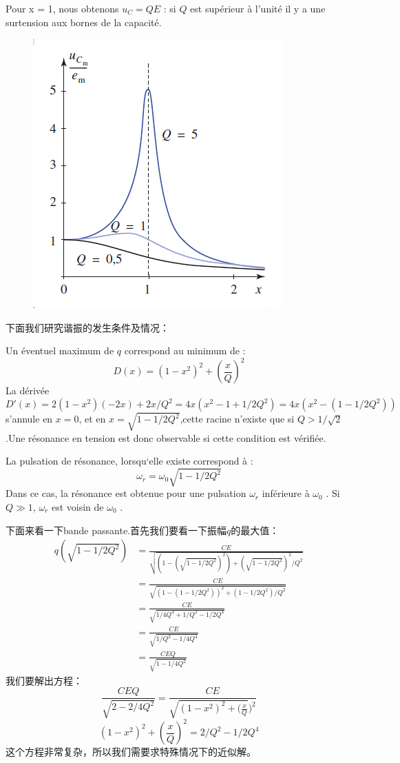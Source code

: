 \documentclass[12pt]{book}
\theoremstyle{definition}\newtheorem{dfn}{Définition}[chapter]
\theoremstyle{plain}\newtheorem{thm}{Théorème}[chapter]
\theoremstyle{plain}\newtheorem{prp}{Proposition}[chapter]
\theoremstyle{plain}\newtheorem{lem}{\bf Lemme}[chapter]
\theoremstyle{plain}\newtheorem{axm}{\bf Axiome}[chapter]
\theoremstyle{plain}\newtheorem{lmm}{\bf Lemme}[chapter]
\theoremstyle{plain}\newtheorem{cor}{\bf Corollaire}[chapter]
\theoremstyle{remark}\newtheorem{rem}{Remarque}[chapter]
\begin{document}
Pour x = 1, nous obtenons $u_C = QE$ : si $Q$ est supérieur à l'unité il y a une {\color{red}surtension}
aux bornes de la capacité.

\begin{figure}[H]
	\centering
	\includegraphics[scale=1]{Etude du circuit RLC serie-Resonances//8}
\end{figure}

下面我们研究谐振的发生条件及情况：

Un éventuel maximum de $q$ correspond au minimum de :
$$
D(x)=(1-x^2)^2+(\frac{x}{Q})^2
$$
La dérivée
 $$D'(x)=2(1-x^2)(-2x)+2x/Q^2=4x(x^2-1+1/2Q^2)=4x(x^2-(1-1/2Q^2))$$
  s'annule en $x = 0$, et en $x=\sqrt{1-1/2Q^2}$,cette racine n'existe que si $Q>1/\sqrt{2}$.Une résonance en tension est donc observable si cette condition est vérifiée.

La pulsation de résonance, lorsqu‘elle existe correspond à :
$$
\omega_r=\omega_0\sqrt{1-1/2Q^2}
$$
Dans ce cas, la résonance est obtenue pour une pulsation $\omega_r$ inférieure
à $\omega_0$ . Si $Q\gg1$, $\omega_r$ est voisin de $\omega_0$ .

下面来看一下bande passante.首先我们要看一下振幅$q$的最大值：
$$
\begin{aligned}
q(\sqrt{1-1/2Q^2})&=\frac{CE}{\sqrt{(1-(\sqrt{1-1/2Q^2})^2)+(\sqrt{1-1/2Q^2})^2/Q^2}}\\
&=\frac{CE}{\sqrt{(1-(1-1/2Q^2))^2+(1-1/2Q^2)/Q^2}}\\
&=\frac{CE}{\sqrt{1/4Q^4+1/Q^2-1/2Q^4}}\\
&=\frac{CE}{\sqrt{1/Q^2-1/4Q^4}}\\
&=\frac{CEQ}{\sqrt{1-1/4Q^2}}
\end{aligned}
$$
我们要解出方程：
$$
\frac{CEQ}{\sqrt{2-2/4Q^2}}=\frac{CE}{\sqrt{(1-x^2)^2+(\frac{x}{Q}})^2}
$$
$$
(1-x^2)^2+(\frac{x}{Q})^2=2/Q^2-1/2Q^4
$$
这个方程非常复杂，所以我们需要求特殊情况下的近似解。
\end{document}
